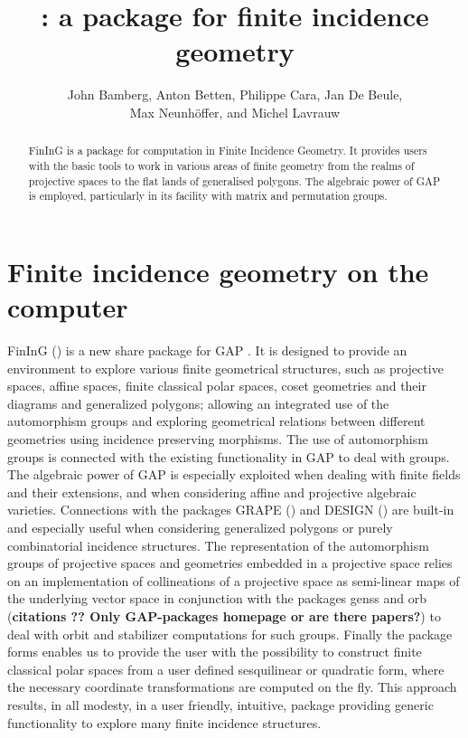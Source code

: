 \documentclass{article}
\author{John Bamberg, Anton Betten, Philippe Cara, Jan De Beule, \\Max Neunh\"offer, and Michel Lavrauw}
\title{\fining{}: a package for finite incidence geometry}
\def\fining{{\sf FinInG}}
\begin{document}
\maketitle
\begin{abstract}
\fining{} is a package for computation in Finite Incidence Geometry. It provides users with the basic tools to work 
in various areas of finite geometry from the realms of projective spaces to the flat lands of generalised polygons. 
The algebraic power of GAP is employed, particularly in its facility with matrix and permutation groups.
\end{abstract}

\section{Finite incidence geometry on the computer}	

\fining{} (\cite{fining}) is a new share package for GAP \cite{GAP4}. It is designed to provide an environment to explore various finite geometrical structures,
such as projective spaces, affine spaces, finite classical polar spaces, coset geometries and their diagrams and generalized polygons; 
allowing an integrated use of the automorphism groups and exploring geometrical relations between different geometries using incidence 
preserving morphisms. The use of automorphism groups is connected with the existing functionality in GAP to deal with groups. The algebraic
power of GAP is especially exploited when dealing with finite fields and their extensions, and when considering affine and projective algebraic
varieties. Connections with the packages {\sf GRAPE} (\cite{grape}) and {\sf DESIGN} (\cite{design}) are built-in and especially useful when considering
generalized polygons or purely combinatorial incidence structures. The representation of the automorphism groups of projective spaces and geometries embedded in a projective
space relies on an implementation of collineations of a projective space as semi-linear maps of the underlying vector space in conjunction with the 
packages {\sf genss} and {\sf orb} (\textbf{citations ?? Only GAP-packages homepage or are there papers?}) to deal with orbit and stabilizer computations for such groups. Finally the package {\sf forms} \cite{forms}
enables us to provide the user with the possibility to construct finite classical polar spaces from a user defined sesquilinear or quadratic form,
where the necessary coordinate transformations are computed on the fly. This approach results, in all modesty, in a user friendly, intuitive, package
providing generic functionality to explore many finite incidence structures.
\end{document}
